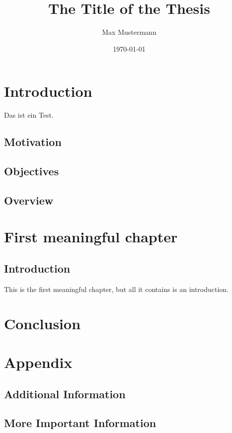 \documentclass[]{stthesis}
\title{The Title of the Thesis}
\author{Max Mustermann}
\date{\today}
\begin{document}
  \maketitle %
  
  \tableofcontents
  
  \chapter{Introduction}
    Das ist ein Test.
  	\section{Motivation}
  	\lipsum
  	
  	\section{Objectives}
  	\lipsum[1-3]
  	
  	\section{Overview}
	\lipsum[1]
    
  \chapter{First meaningful chapter}
  
     \section{Introduction}
       This is the first meaningful chapter, but all it contains is an introduction.

  \chapter{Conclusion}
  	\lipsum[1]

  \backmatter
  
  \appendix
  \chapter{Appendix}
  \section{Additional Information}
  \lipsum[1]
  
  \section{More Important Information}
  \lipsum[1]
  
\end{document}
